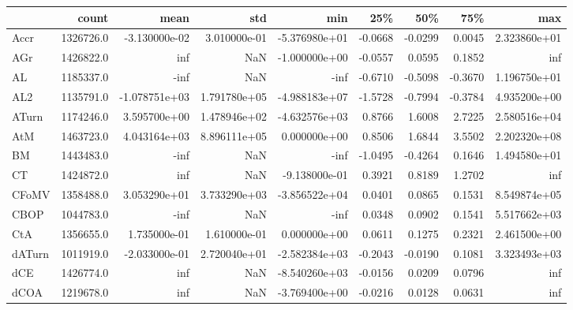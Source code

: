 \begin{tabular}{lrrrrrrrr}
\toprule
{} &      count &          mean &           std &           min &        25\% &        50\% &        75\% &           max \\
\midrule
Accr      &  1326726.0 & -3.130000e-02 &  3.010000e-01 & -5.376980e+01 &    -0.0668 &    -0.0299 &     0.0045 &  2.323860e+01 \\
AGr       &  1426822.0 &           inf &           NaN & -1.000000e+00 &    -0.0557 &     0.0595 &     0.1852 &           inf \\
AL        &  1185337.0 &          -inf &           NaN &          -inf &    -0.6710 &    -0.5098 &    -0.3670 &  1.196750e+01 \\
AL2       &  1135791.0 & -1.078751e+03 &  1.791780e+05 & -4.988183e+07 &    -1.5728 &    -0.7994 &    -0.3784 &  4.935200e+00 \\
ATurn     &  1174246.0 &  3.595700e+00 &  1.478946e+02 & -4.632576e+03 &     0.8766 &     1.6008 &     2.7225 &  2.580516e+04 \\
AtM       &  1463723.0 &  4.043164e+03 &  8.896111e+05 &  0.000000e+00 &     0.8506 &     1.6844 &     3.5502 &  2.202320e+08 \\
BM        &  1443483.0 &          -inf &           NaN &          -inf &    -1.0495 &    -0.4264 &     0.1646 &  1.494580e+01 \\
CT        &  1424872.0 &           inf &           NaN & -9.138000e-01 &     0.3921 &     0.8189 &     1.2702 &           inf \\
CFoMV     &  1358488.0 &  3.053290e+01 &  3.733290e+03 & -3.856522e+04 &     0.0401 &     0.0865 &     0.1531 &  8.549874e+05 \\
CBOP      &  1044783.0 &          -inf &           NaN &          -inf &     0.0348 &     0.0902 &     0.1541 &  5.517662e+03 \\
CtA       &  1356655.0 &  1.735000e-01 &  1.610000e-01 &  0.000000e+00 &     0.0611 &     0.1275 &     0.2321 &  2.461500e+00 \\
dATurn    &  1011919.0 & -2.033000e-01 &  2.720040e+01 & -2.582384e+03 &    -0.2043 &    -0.0190 &     0.1081 &  3.323493e+03 \\
dCE       &  1426774.0 &           inf &           NaN & -8.540260e+03 &    -0.0156 &     0.0209 &     0.0796 &           inf \\
dCOA      &  1219678.0 &           inf &           NaN & -3.769400e+00 &    -0.0216 &     0.0128 &     0.0631 &           inf \\

\end{tabular}
